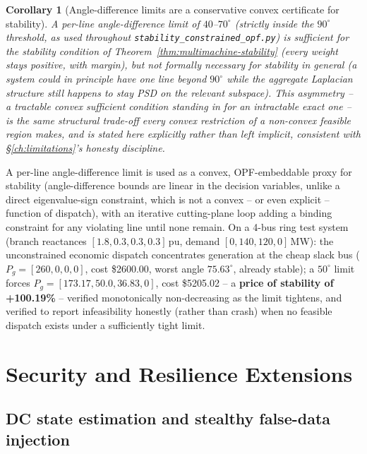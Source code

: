 \documentclass[11pt]{report}
\newcommand{\pkg}[1]{\texttt{#1}}
\theoremstyle{plain}
\newtheorem{corollary}[theorem]{Corollary}
\theoremstyle{definition}
\theoremstyle{remark}
\begin{document}
\begin{corollary}[Angle-difference limits are a conservative convex certificate for stability]
\label{cor:angle-certificate}
A per-line angle-difference limit of $40$--$70^\circ$ (strictly inside
the $90^\circ$ threshold, as used throughout
\pkg{stability\_\hspace{0pt}constrained\_\hspace{0pt}opf.py}) is \emph{sufficient}
for the stability condition of Theorem~\ref{thm:multimachine-stability}
(every weight stays positive, with margin), but not formally
\emph{necessary} for stability in general (a system could in principle
have one line beyond $90^\circ$ while the aggregate Laplacian structure
still happens to stay PSD on the relevant subspace). This asymmetry --
a tractable convex sufficient condition standing in for an intractable
exact one -- is the same structural trade-off every convex
restriction of a non-convex feasible region makes, and is stated here
explicitly rather than left implicit, consistent with
\S\ref{ch:limitations}'s honesty discipline.
\end{corollary}

A per-line angle-difference limit is used as a convex, OPF-embeddable
proxy for stability (angle-difference bounds are linear in the decision
variables, unlike a direct eigenvalue-sign constraint, which is not a
convex -- or even explicit -- function of dispatch), with an iterative
cutting-plane loop adding a binding constraint for any violating line
until none remain. On a 4-bus ring test system (branch reactances
$[1.8,0.3,0.3,0.3]$\,pu, demand $[0,140,120,0]$\,MW): the unconstrained
economic dispatch concentrates generation at the cheap slack bus
($P_g=[260,0,0,0]$, cost \$2600.00, worst angle $75.63^\circ$, already
stable); a $50^\circ$ limit forces $P_g=[173.17,50.0,36.83,0]$, cost
\$5205.02 -- a \textbf{price of stability of +100.19\%} -- verified
monotonically non-decreasing as the limit tightens, and verified to
report infeasibility honestly (rather than crash) when no feasible
dispatch exists under a sufficiently tight limit.

\chapter{Security and Resilience Extensions}
\label{ch:resilience}

\section{DC state estimation and stealthy false-data injection}
\label{sec:fdia-theory}
\end{document}
